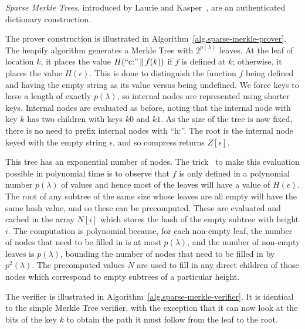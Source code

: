 \emph{Sparse Merkle Trees}, introduced by Laurie
and Kasper~\cite{revocation-transparency}, are an authenticated
dictionary construction.

The prover construction is illustrated in
Algorithm~\ref{alg.sparse-merkle-prover}. The \textsf{heapify} algorithm
generates a Merkle Tree with $2^{p(\lambda)}$ leaves. At the leaf of location
$k$, it places the value $H(\text{``c:''} \,\|\, f(k))$ if $f$ is defined at
$k$; otherwise, it places the value $H(\epsilon)$. This is done to distinguish
the function $f$ being defined and having the empty string as its value versus
being undefined. We force keys to have a
length of exactly $p(\lambda)$, so internal nodes are represented using shorter
keys. Internal nodes are
evaluated as before, noting that the internal node with key $k$ has two
children with keys $k0$ and $k1$. As the size of the tree is now fixed, there is
no need to prefix internal nodes with ``h:''. The root is the internal node
keyed with the empty string $\epsilon$, and so \textsf{compress} returns
$Z[\epsilon]$.



This tree has an exponential number of nodes. The trick~\cite{sparse-mt} to make this
evaluation possible in polynomial time is to observe that $f$ is only defined
in a polynomial number $p(\lambda)$ of values and hence most of the leaves will
have a value of $H(\epsilon)$. The root of any subtree of the same size whose
leaves are all empty will have the same hash value, and so these can be
precomputed. These are evaluated and cached in the array $N[i]$ which stores the
hash of the empty subtree with height $i$. The computation is polynomial
because, for each non-empty leaf, the number of nodes that need to be filled in
is at most $p(\lambda)$, and the number of non-empty leaves is $p(\lambda)$,
bounding the number of nodes that need to be filled in by $p^2(\lambda)$. The
precomputed values $N$ are used to fill in any direct children of those nodes
which correspond to empty subtrees of a particular height.



The verifier is illustrated in Algorithm~\ref{alg.sparse-merkle-verifier}. It is
identical to the simple Merkle Tree verifier, with the exception that it can now
look at the bits of the key $k$ to obtain the path it must follow from the leaf
to the root.

